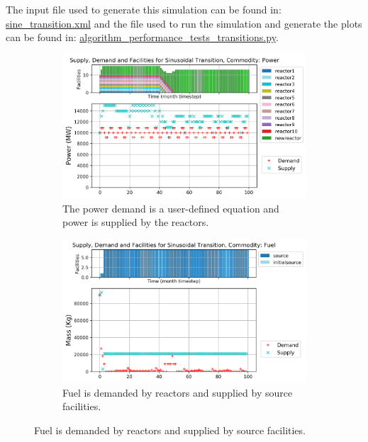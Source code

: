 \documentclass[11pt]{article}
\begin{document}
The input file used to generate this simulation can be found in:
\href{https://github.com/arfc/d3ploy/blob/master/input/sine_transition.xml}{sine\_transition.xml} 
and the file used to run the simulation and generate the plots can be found in:
\href{https://github.com/arfc/d3ploy/blob/master/tests/performance_tests/algorithm_performance_tests_transitions.py}{algorithm\_performance\_tests\_transitions.py}.

\begin{figure}[!htbp]
    \centering
    \begin{subfigure}[t]{\textwidth}
    \centering
        \includegraphics[width=0.8\linewidth]{figures/sinetransition-power.png} 
        \caption{The power demand is a user-defined equation and power is supplied by the reactors.}
        \label{fig:sinetransition-power}
    \end{subfigure}
    \begin{subfigure}[t]{0.65\textwidth}
        \centering
        \includegraphics[width=\linewidth]{figures/sinetransition-fuel.png} 
        \caption{Fuel is demanded by reactors and supplied by source facilities.}
	    \label{fig:sinetransition-fuel}
    \end{subfigure}

\end{figure}
\end{document}
